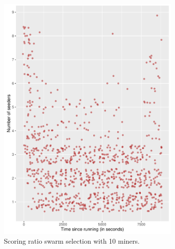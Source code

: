 \begin{figure}[tb]
	\begin{adjustwidth}{-1.5cm}{}
		\begin{subfigure}[t]{0.6\textwidth}
			\centering
			\includegraphics[width=\textwidth]{pics/results/sc10_scatter.pdf}
			\caption{Scoring ratio swarm selection with 10 miners.}
			\label{fig:scattersc10}
		\end{subfigure}
		~
		\begin{subfigure}[t]{0.6\textwidth}
			\centering

\end{subfigure}
\end{adjustwidth}
\end{figure}
